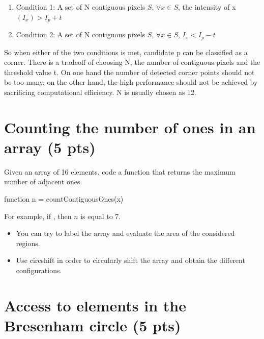\begin{wikipedia}
\begin{enumerate}
   \item  Condition 1: A set of N contiguous pixels $S$, $\forall x \in S$, the intensity of x $(I_x) > I_p + t$
   \item  Condition 2: A set of N contiguous pixels $S$, $\forall x \in S$, $I_x < I_p - t$
    \end{enumerate}

So when either of the two conditions is met, candidate p can be classified as a corner. There is a tradeoff of choosing N, the number of contiguous pixels and the threshold value t. On one hand the number of detected corner points should not be too many, on the other hand, the high performance should not be achieved by sacrificing computational efficiency. N is usually chosen as 12.
\end{wikipedia}


\section{Counting the number of ones in an array (5 pts)}
\begin{qbox}
Given an array of 16 elements, code a function that returns the maximum number of adjacent ones. 
\begin{matlab}
function n = countContiguousOnes(x)
\end{matlab}
\end{qbox}

For example, if , then $n$ is equal to 7. 

\begin{mcomment}
\begin{mremark}
\begin{itemize}
 \item You can try to label the array and evaluate the area  of the considered regions.
 \item Use circshift in order to circularly shift the array and obtain the different configurations.
\end{itemize}

\end{mremark}
\end{mcomment}

\section{Access to elements in the Bresenham circle (5 pts)}

